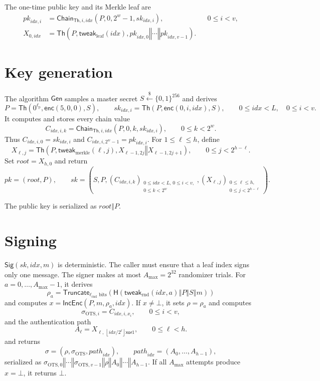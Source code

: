 \documentclass[11pt]{article}
\theoremstyle{definition}
\theoremstyle{plain}
\theoremstyle{remark}
\newcommand{\bits}[1]{\{0,1\}^{#1}}
\newcommand{\getsr}{\stackrel{\$}{\gets}}
\newcommand{\Th}{\mathsf{Th}}
\newcommand{\IncEnc}{\mathsf{IncEnc}}
\newcommand{\Gen}{\mathsf{Gen}}
\newcommand{\Sig}{\mathsf{Sig}}
\newcommand{\Chain}{\mathsf{Chain}}
\newcommand{\hash}{\mathsf{H}}
\newcommand{\Truncate}{\mathsf{Truncate}}
\newcommand{\concat}{\mathbin\Vert}
\newcommand{\idx}{\mathit{idx}}
\newcommand{\sk}{\mathit{sk}}
\newcommand{\pk}{\mathit{pk}}
\newcommand{\rootnode}{\mathit{root}}
\newcommand{\lpar}{\ell_{\mathrm{p}}}
\newcommand{\lrnd}{\ell_{\mathrm{rnd}}}
\newcommand{\amax}{A_{\max}}
\begin{document}
The one-time public key and its Merkle leaf are
\[
\begin{aligned}
  \mathit{pk}_{\idx,i} &= \Chain_{\Th,i,\idx}(P,0,2^w-1,\mathit{sk}_{\idx,i}), &&0\leq i<v,\\
  X_{0,\idx} &= \Th\!\left(P,\mathsf{tweak}_{\mathrm{leaf}}(\idx),\mathit{pk}_{\idx,0}\concat\cdots\concat\mathit{pk}_{\idx,v-1}\right).
\end{aligned}
\]

\section{Key generation}

The algorithm $\Gen$ samples a master secret $S\getsr\bits{256}$ and derives
\[
  P=\Th\!\left(0^{\lpar},\mathsf{enc}(5,0,0),S\right),
  \qquad
  \mathit{sk}_{\idx,i}=\Th\!\left(P,\mathsf{enc}(0,i,\idx),S\right),
  \qquad 0\leq\idx<L,\quad 0\leq i<v.
\]
It computes and stores every chain value
\[
  C_{\idx,i,k}=\Chain_{\Th,i,\idx}(P,0,k,\mathit{sk}_{\idx,i}),
  \qquad 0\leq k<2^w.
\]
Thus $C_{\idx,i,0}=\mathit{sk}_{\idx,i}$ and $C_{\idx,i,2^w-1}=\mathit{pk}_{\idx,i}$. For $1\leq\ell\leq h$, define
\[
  X_{\ell,j}=\Th\!\left(P,\mathsf{tweak}_{\mathrm{merkle}}(\ell,j),X_{\ell-1,2j}\concat X_{\ell-1,2j+1}\right),
  \qquad 0\leq j<2^{h-\ell}.
\]
Set $\rootnode=X_{h,0}$ and return
\[
  \pk=(\rootnode,P),
  \qquad
  \sk=\left(S,P,(C_{\idx,i,k})_{\substack{0\leq\idx<L,\,0\leq i<v,\\0\leq k<2^w}},(X_{\ell,j})_{\substack{0\leq\ell\leq h,\\0\leq j<2^{h-\ell}}}\right).
\]

The public key is serialized as $\rootnode\concat P$.

\section{Signing}

$\Sig(\sk,\idx,m)$ is deterministic. The caller must ensure that a leaf index signs only one message. The signer makes at most $\amax=2^{32}$ randomizer trials. For $a=0,\ldots,\amax-1$, it derives
\[
  \rho_a=\Truncate_{\lrnd\text{ bits}}\!\left(\hash(\mathsf{tweak}_{\mathrm{rnd}}(\idx,a)\concat P\concat S\concat m)\right)
\]
and computes $x=\IncEnc(P,m,\rho_a,\idx)$. If $x\neq\bot$, it sets $\rho=\rho_a$ and computes
\[
  \sigma_{\mathrm{OTS},i}=C_{\idx,i,x_i},
  \qquad 0\leq i<v,
\]
and the authentication path
\[
  A_\ell=X_{\ell,\,\left\lfloor\idx/2^\ell\right\rfloor\mathbin{\mathsf{xor}}1},
  \qquad 0\leq\ell<h.
\]
and returns
\[
  \sigma=(\rho,\sigma_{\mathrm{OTS}},\mathit{path}_{\idx}),
  \qquad
  \mathit{path}_{\idx}=(A_0,\ldots,A_{h-1}),
\]
serialized as $\sigma_{\mathrm{OTS},0}\concat\cdots\concat\sigma_{\mathrm{OTS},v-1}\concat\rho\concat A_0\concat\cdots\concat A_{h-1}$. If all $\amax$ attempts produce $x=\bot$, it returns $\bot$.
\end{document}
